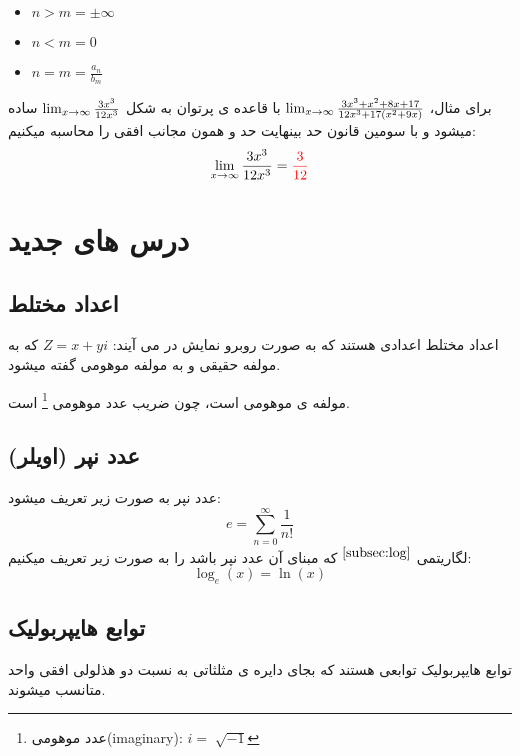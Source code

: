 \documentclass[12pt, a4paper, oneside]{article}
\begin{document}
\begin{latin}
\begin{itemize}
    \item $n > m = \pm \infty$
    \item $n < m = 0$
    \item $n = m = \frac{ a_n }{ b_m }$
\end{itemize}
\end{latin}

برای مثال، $\lim_{x \to \infty} \frac{3x^3+x^2+8x+17}{12x^3+17(x^2+9x)}$ با قاعده ی پرتوان به شکل $\lim_{x \to \infty} \frac{3x^3}{12x^3}$ ساده میشود و با سومین قانون حد بینهایت حد و همون مجانب افقی را محاسبه میکنیم:
\[\lim_{x \to \infty} \frac{3x^3}{12x^3} = \textcolor{red}{ \frac{3}{12} }\]


\section{درس های جدید}
\subsection{اعداد مختلط}
اعداد مختلط اعدادی هستند که به صورت روبرو نمایش در می آیند: $Z = x + yi$
که به  مولفه حقیقی و به  مولفه موهومی گفته میشود.

 مولفه ی موهومی است، چون ضریب عدد موهومی \footnote{عدد موهومی(imaginary): $i=\sqrt[]{-1}$} است.
\subsection{عدد نپر (اویلر)}
عدد نپر به صورت زیر تعریف میشود:
\[e=\sum_{n=0}^{\infty} \frac{1}{n!}\]
لگاریتمی
{$\overset{\ref{subsec:log}}{}$}
 که مبنای آن عدد نپر باشد را به صورت زیر تعریف میکنیم: 
\[\log_e (x) = \ln (x)\]
\subsection{توابع هایپربولیک}
توابع هایپربولیک توابعی هستند که بجای دایره ی مثلثاتی به نسبت دو هذلولی افقی واحد متانسب میشوند.
 
\end{document}
